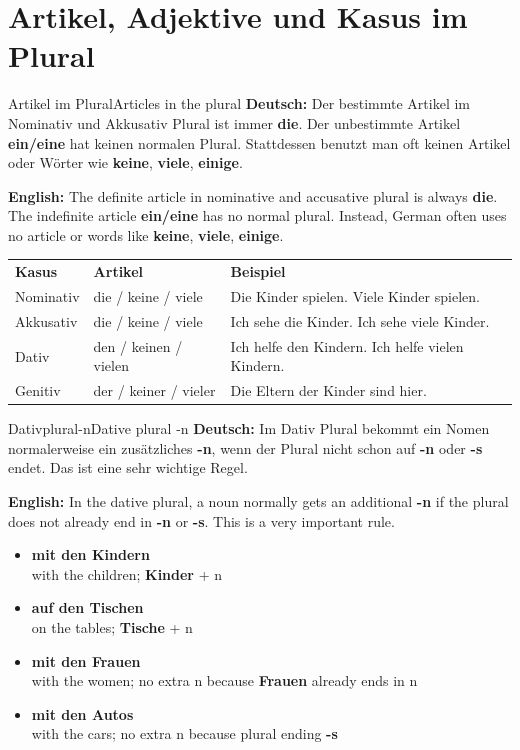 \documentclass[a4paper,11pt]{article}
\newcommand{\GermanText}[1]{\textbf{Deutsch: }#1\par}
\newcommand{\EnglishText}[1]{{\small\color{SoftGray}\textbf{English: }#1\par}}
\newcommand{\ExampleItem}[2]{\item \textbf{#1}\\{\small\color{SoftGray}#2}}
\newcommand{\TableHead}[3]{\rowcolor{HeaderBlueDark}\color{white}\textbf{#1} & \color{white}\textbf{#2} & \color{white}\textbf{#3}\\}
\begin{document}
\section{Artikel, Adjektive und Kasus im Plural}

\begin{grammarentry}{Artikel im Plural}{Articles in the plural}
\GermanText{Der bestimmte Artikel im Nominativ und Akkusativ Plural ist immer \textbf{die}. Der unbestimmte Artikel \textbf{ein/eine} hat keinen normalen Plural. Stattdessen benutzt man oft keinen Artikel oder Wörter wie \textbf{keine}, \textbf{viele}, \textbf{einige}.}
\EnglishText{The definite article in nominative and accusative plural is always \textbf{die}. The indefinite article \textbf{ein/eine} has no normal plural. Instead, German often uses no article or words like \textbf{keine}, \textbf{viele}, \textbf{einige}.}

\begin{longtable}{>{\RaggedRight\arraybackslash}p{}>{\RaggedRight\arraybackslash}p{}>{\RaggedRight\arraybackslash}p{}}
\TableHead{Kasus}{Artikel}{Beispiel}
\rowcolor{RowBlueLight} Nominativ & die / keine / viele & Die Kinder spielen. Viele Kinder spielen. \\
\rowcolor{RowBlueDark} Akkusativ & die / keine / viele & Ich sehe die Kinder. Ich sehe viele Kinder. \\
\rowcolor{RowBlueLight} Dativ & den / keinen / vielen & Ich helfe den Kindern. Ich helfe vielen Kindern. \\
\rowcolor{RowBlueDark} Genitiv & der / keiner / vieler & Die Eltern der Kinder sind hier. \\
\end{longtable}
\end{grammarentry}

\begin{grammarentry}{Dativplural-n}{Dative plural -n}
\GermanText{Im Dativ Plural bekommt ein Nomen normalerweise ein zusätzliches \textbf{-n}, wenn der Plural nicht schon auf \textbf{-n} oder \textbf{-s} endet. Das ist eine sehr wichtige Regel.}
\EnglishText{In the dative plural, a noun normally gets an additional \textbf{-n} if the plural does not already end in \textbf{-n} or \textbf{-s}. This is a very important rule.}
\begin{exbox}
\begin{itemize}
\ExampleItem{mit den Kindern}{with the children; \textbf{Kinder} + n}
\ExampleItem{auf den Tischen}{on the tables; \textbf{Tische} + n}
\ExampleItem{mit den Frauen}{with the women; no extra n because \textbf{Frauen} already ends in n}
\ExampleItem{mit den Autos}{with the cars; no extra n because plural ending \textbf{-s}}
\end{itemize}
\end{exbox}
\end{grammarentry}
\end{document}
